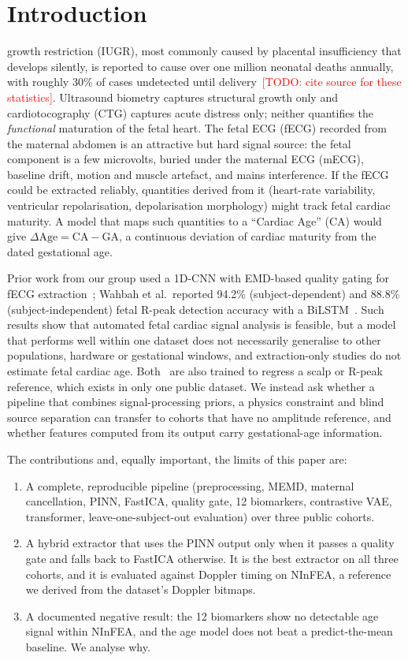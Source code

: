 \documentclass[journal]{IEEEtran}
\newcommand{\todo}[1]{\textcolor{red}{[TODO: #1]}}
\begin{document}
\section{Introduction}
 growth restriction (IUGR), most commonly caused by placental insufficiency that develops silently, is reported to cause over one million neonatal deaths annually, with roughly 30\% of cases undetected until delivery~\todo{cite source for these statistics}. Ultrasound biometry captures structural growth only and cardiotocography (CTG) captures acute distress only; neither quantifies the \emph{functional} maturation of the fetal heart. The fetal ECG (fECG) recorded from the maternal abdomen is an attractive but hard signal source: the fetal component is a few microvolts, buried under the maternal ECG (mECG), baseline drift, motion and muscle artefact, and mains interference. If the fECG could be extracted reliably, quantities derived from it (heart-rate variability, ventricular repolarisation, depolarisation morphology) might track fetal cardiac maturity. A model that maps such quantities to a ``Cardiac Age'' (CA) would give $\Delta\mathrm{Age}=\mathrm{CA}-\mathrm{GA}$, a continuous deviation of cardiac maturity from the dated gestational age.

Prior work from our group used a 1D-CNN with EMD-based quality gating for fECG extraction~\cite{muthukumar2026icc}; Wahbah et al.\ reported 94.2\% (subject-dependent) and 88.8\% (subject-independent) fetal R-peak detection accuracy with a BiLSTM~\cite{wahbah2024}. Such results show that automated fetal cardiac signal analysis is feasible, but a model that performs well within one dataset does not necessarily generalise to other populations, hardware or gestational windows, and extraction-only studies do not estimate fetal cardiac age. Both~\cite{muthukumar2026icc,wahbah2024} are also trained to regress a scalp or R-peak reference, which exists in only one public dataset. We instead ask whether a pipeline that combines signal-processing priors, a physics constraint and blind source separation can transfer to cohorts that have no amplitude reference, and whether features computed from its output carry gestational-age information.

The contributions and, equally important, the limits of this paper are:
\begin{enumerate}
\item A complete, reproducible pipeline (preprocessing, MEMD, maternal cancellation, PINN, FastICA, quality gate, 12 biomarkers, contrastive VAE, transformer, leave-one-subject-out evaluation) over three public cohorts.
\item A hybrid extractor that uses the PINN output only when it passes a quality gate and falls back to FastICA otherwise. It is the best extractor on all three cohorts, and it is evaluated against Doppler timing on NInFEA, a reference we derived from the dataset's Doppler bitmaps.
\item A documented negative result: the 12 biomarkers show no detectable age signal within NInFEA, and the age model does not beat a predict-the-mean baseline. We analyse why.
\end{enumerate}
\end{document}
